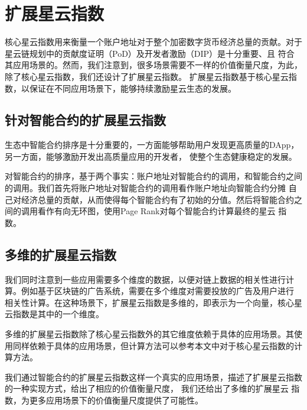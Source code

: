 \section{扩展星云指数}
核心星云指数用来衡量一个账户地址对于整个加密数字货币经济总量的贡献。对于星云链规划中的贡献度证明（PoD）及开发者激励（DIP）是十分重要、且
符合其应用场景的。然而，我们注意到，很多场景需要不一样的价值衡量尺度，为此，除了核心星云指数，我们还设计了扩展星云指数。
扩展星云指数基于核心星云指数，以保证在不同应用场景下，能够持续激励星云生态的发展。

\subsection{针对智能合约的扩展星云指数}
生态中智能合约排序是十分重要的，一方面能够帮助用户发现更高质量的DApp，另一方面，能够激励开发出高质量应用的开发者，
使整个生态健康稳定的发展。

对智能合约的排序，基于两个事实：账户地址对智能合约的调用，和智能合约之间的调用。我们首先将账户地址对智能合约的调用看作账户地址向智能合约分摊
自己对经济总量的贡献，从而使得每个智能合约有了初始的分值。然后将智能合约之间的调用看作有向无环图，使用Page Rank对每个智能合约计算最终的星云
指数。


\subsection{多维的扩展星云指数}
我们同时注意到一些应用需要多个维度的数据，以便对链上数据的相关性进行计算。例如基于区块链的广告系统，需要在多个维度对需要投放的广告及用户进行
相关性计算。在这种场景下，扩展星云指数是多维的，即表示为一个向量，核心星云指数是其中的一个维度。

多维的扩展星云指数除了核心星云指数外的其它维度依赖于具体的应用场景。其使用同样依赖于具体的应用场景，但计算方法可以参考本文中对于核心星云指数的计算方法。

\vspace{2em}

我们通过智能合约的扩展星云指数这样一个真实的应用场景，描述了扩展星云指数的一种实现方式，给出了相应的价值衡量尺度，
我们还给出了多维的扩展星云
指数，为更多应用场景下的价值衡量尺度提供了可能性。
